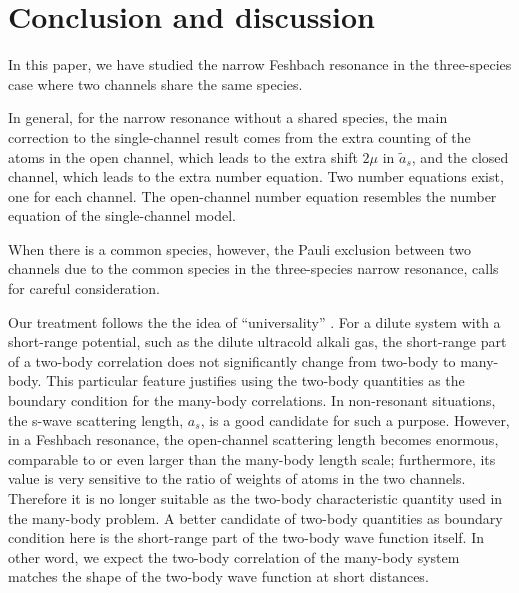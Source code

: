 \documentclass[reprint,pra]{revtex4-1}
\begin{document}
\section{Conclusion  and discussion\label{sec:conclusion}}
In this paper, we have studied the narrow Feshbach resonance in  the three-species case where two channels share the same species.  

In general, for the narrow resonance without a shared species, the main correction to the single-channel result comes from the  extra counting of the atoms in the open channel, which leads to the extra shift $2\mu$ in $\tilde{a}_{s}$, and the closed channel, which leads to the extra number equation.  Two number equations exist, one for each channel.  The open-channel number equation resembles the number equation of the single-channel model.

When there is a common species,  however, the  Pauli exclusion between two channels due to the common species in the three-species narrow resonance, calls for careful  consideration. 

  Our treatment follows the the  idea of ``universality'' \cite{Tan2008-1,shizhongUniv}.  For a dilute system with a short-range potential, such as the dilute ultracold alkali gas, the short-range part of a two-body correlation does not significantly change from two-body  to many-body.  This particular feature justifies using the two-body quantities  as the boundary condition for the many-body correlations.  In non-resonant situations, the s-wave scattering length, $a_s$, is a good candidate for such a purpose.  However, in a Feshbach resonance, the open-channel scattering length becomes enormous, comparable to or even larger than the many-body length scale; furthermore, its value is very sensitive to the ratio of weights of atoms in the two channels.  Therefore it is no longer suitable as the two-body characteristic quantity used in  the many-body problem. A better candidate of two-body quantities as boundary condition here is the short-range part of the two-body wave function itself.  In other word, we expect the two-body correlation of the many-body system matches the shape of the two-body wave function  at short distances.  
  
\end{document}
